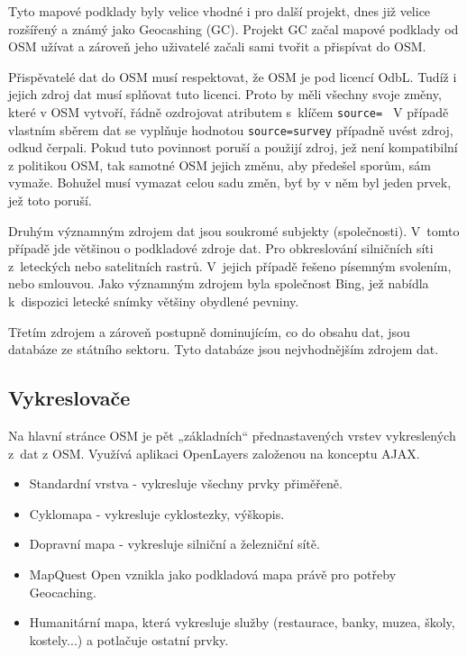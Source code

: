Tyto mapové podklady byly velice vhodné i pro další projekt, dnes již 
velice rozšířený a známý jako Geocashing (GC). Projekt GC začal mapové 
podklady od OSM užívat a zároveň jeho uživatelé začali sami tvořit a 
přispívat do OSM. 

Přispěvatelé dat do OSM musí respektovat, že OSM je pod licencí OdbL. 
Tudíž i jejich zdroj dat musí splňovat tuto licenci. Proto by měli 
všechny svoje změny, které v OSM vytvoří, řádně ozdrojovat atributem 
s~klíčem 
{\tt source= }
V případě vlastním sběrem dat se vyplňuje hodnotou 
{\tt source=survey}
případně uvést zdroj, odkud čerpali. Pokud tuto povinnost poruší a 
použijí zdroj, jež není kompatibilní z politikou OSM, tak samotné OSM 
jejich změnu, aby předešel sporům, sám vymaže. Bohužel musí vymazat 
celou sadu změn, byť by v něm byl jeden prvek, jež toto poruší. 

Druhým významným zdrojem dat jsou soukromé subjekty (společnosti). 
V~tomto případě jde většinou o podkladové zdroje dat. Pro obkreslování 
silničních síti z~leteckých nebo satelitních rastrů. V~jejich případě 
řešeno písemným svolením, nebo smlouvou. Jako významným zdrojem byla 
společnost Bing, jež nabídla k~dispozici letecké snímky většiny 
obydlené pevniny. 

Třetím zdrojem a zároveň postupně dominujícím, co do obsahu dat, jsou 
databáze ze státního sektoru. Tyto databáze jsou nejvhodnějším zdrojem 
dat.

\subsection{Vykreslovače}
\label{vykreslovače}
Na hlavní stránce OSM je pět „základních“ přednastavených vrstev vykreslených 
z~dat z OSM. Využívá aplikaci OpenLayers založenou na konceptu AJAX.

\begin{itemize}

  \item Standardní vrstva - vykresluje všechny prvky přiměřeně.
  \item Cyklomapa - vykresluje cyklostezky, výškopis. 
  \item Dopravní mapa - vykresluje silniční a železniční sítě.
  \item MapQuest Open vznikla jako podkladová mapa právě pro potřeby 
Geocaching.
  \item Humanitární mapa, která vykresluje služby (restaurace, banky, muzea, 
  školy, kostely...)  a potlačuje ostatní prvky. 

\end{itemize}

